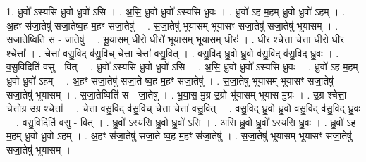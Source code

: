 \documentclass[17pt]{extarticle}
\begin{document}
1. ध्रु॒वो᳚ ऽस्यसि ध्रु॒वो ध्रु॒वो॑ ऽसि । . अ॒सि॒ ध्रु॒वो ध्रु॒वो᳚ ऽस्यसि ध्रु॒वः । . ध्रु॒वो॑ ऽह म॒हम् ध्रु॒वो ध्रु॒वो॑ ऽहम् । . अ॒हꣳ स॑जा॒तेषु॑ सजा॒तेष्व॒ह म॒हꣳ स॑जा॒तेषु॑ । . स॒जा॒तेषु॑ भूयासम् भूयासꣳ सजा॒तेषु॑ सजा॒तेषु॑ भूयासम् । . स॒जा॒तेष्विति॑ स - जा॒तेषु॑ । . भू॒या॒स॒म् धीरो॒ धीरो॑ भूयासम् भूयास॒म् धीरः॑ । . धीर॒ श्चेत्ता॒ चेत्ता॒ धीरो॒ धीर॒ श्चेत्ता᳚ । . चेत्ता॑ वसु॒विद् व॑सु॒विच् चेत्ता॒ चेत्ता॑ वसु॒वित् । . व॒सु॒विद् ध्रु॒वो ध्रु॒वो व॑सु॒विद् व॑सु॒विद् ध्रु॒वः । . व॒सु॒विदिति॑ वसु - वित् । . ध्रु॒वो᳚ ऽस्यसि ध्रु॒वो ध्रु॒वो॑ ऽसि । . अ॒सि॒ ध्रु॒वो ध्रु॒वो᳚ ऽस्यसि ध्रु॒वः । . ध्रु॒वो॑ ऽह म॒हम् ध्रु॒वो ध्रु॒वो॑ ऽहम् । . अ॒हꣳ स॑जा॒तेषु॑ सजा॒ते ष्व॒ह म॒हꣳ स॑जा॒तेषु॑ । . स॒जा॒तेषु॑ भूयासम् भूयासꣳ सजा॒तेषु॑ सजा॒तेषु॑ भूयासम् । . स॒जा॒तेष्विति॑ स - जा॒तेषु॑ । . भू॒या॒स॒ मु॒ग्र उ॒ग्रो भू॑यासम् भूयास मु॒ग्रः । . उ॒ग्र श्चेत्ता॒ चेत्तो॒ग्र उ॒ग्र श्चेत्ता᳚ । . चेत्ता॑ वसु॒विद् व॑सु॒विच् चेत्ता॒ चेत्ता॑ वसु॒वित् । . व॒सु॒विद् ध्रु॒वो ध्रु॒वो व॑सु॒विद् व॑सु॒विद् ध्रु॒वः । . व॒सु॒विदिति॑ वसु - वित् । . ध्रु॒वो᳚ ऽस्यसि ध्रु॒वो ध्रु॒वो॑ ऽसि । . अ॒सि॒ ध्रु॒वो ध्रु॒वो᳚ ऽस्यसि ध्रु॒वः । . ध्रु॒वो॑ ऽह म॒हम् ध्रु॒वो ध्रु॒वो॑ ऽहम् । . अ॒हꣳ स॑जा॒तेषु॑ सजा॒ते ष्व॒ह म॒हꣳ स॑जा॒तेषु॑ । . स॒जा॒तेषु॑ भूयासम् भूयासꣳ सजा॒तेषु॑ सजा॒तेषु॑ भूयासम् । \newline
\end{document}
